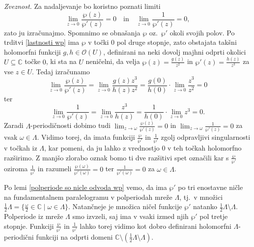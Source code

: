 \documentclass[mat1]{fmfdelo}
\numberwithin{equation}{section}
\newcommand{\C}{\mathbb C}
\newcommand{\om}{\omega}
\newcommand{\torus}{\C/\Lambda}
\newcommand{\hol}[1]{\mathcal{O}(#1)}
\newcommand{\tj}{tj.\ }
\newcommand{\oz}{oz.\ }
\theoremstyle{definition}
\begin{document}
\begin{dokaz}
    \emph{Zveznost.}
    Za nadaljevanje bo koristno poznati limiti
    \[
        \lim_{z \to 0} \frac{\wp(z)}{\wp'(z)} = 0 \quad \text{in} \quad 
        \lim_{z \to 0} \frac{1}{\wp'(z)} = 0,
    \] 
    zato ju izračunajmo. Spomnimo se obnašanja $\wp$ \oz $\wp'$ okoli svojih polov. Po trditvi \ref{lastnosti wp} ima $\wp$ v točki $0$ pol druge stopnje, zato obstajata takšni holomorfni funkciji $g,h \in \hol{U}$, definirani na neki dovolj majhni odprti okolici $U\subseteq\C$ točke $0$, ki sta na $U$ neničelni, da velja $\wp(z) = \frac{g(z)}{z^2}$ in $\wp'(z) = \frac{h(z)}{z^3}$ za vse $z \in U$. Tedaj izračunamo
    \[
        \lim_{z \to 0} \frac{\wp(z)}{\wp'(z)} = \lim_{z \to 0} \frac{g(z)z^3}{h(z)z^2} = 
        \frac{g(0)}{h(0)} \cdot \lim_{z \to 0}\frac{z^3}{z^2} = 0
    \]
    ter
    \[
        \lim_{z \to 0} \frac{1}{\wp'(z)} = \lim_{z \to 0} \frac{z^3}{h(z)} = 
        \frac{1}{h(0)} \cdot \lim_{z \to 0}z^3 = 0.
    \]
    Zaradi $\Lambda$-periodičnosti dobimo tudi $\lim_{z \to \om} \frac{\wp(z)}{\wp'(z)} = 0$ in $\lim_{z \to \om} \frac{1}{\wp'(z)} = 0$ za vsak $\om \in \Lambda$. Vidimo torej, da imata funkciji $\frac{\wp}{\wp'}$ in $\frac{1}{\wp'}$ zgolj odpravljivi singularnosti v točkah iz $\Lambda$, kar pomeni, da ju lahko z vrednostjo $0$ v teh točkah holomorfno razširimo. Z manjšo zlorabo oznak bomo ti dve razšitivi spet označili kar s $\frac{\wp}{\wp'}$ oziroma $\frac{1}{\wp'}$ in razumeli $\frac{\wp(\om)}{\wp'(\om)} = 0$ ter $\frac{1}{\wp'(\om)} = 0$ za $\om \in \Lambda$.

    Po lemi \ref{polperiode so nicle odvoda wp} vemo, da ima $\wp'$ po tri enostavne ničle na fundamentalnem paralelogramu v polperiodah mreže $\Lambda$, \tj v množici $\frac{1}{2}\Lambda = \{\frac{\om}{2} \in \C \mid \om \in \Lambda\}$. 
    Natančneje je množica ničel funkcije $\wp'$ natanko $\frac12\Lambda \setminus \Lambda$. Polperiode iz mreže $\Lambda$ smo izvzeli, saj ima v vsaki izmed njih $\wp'$ pol tretje stopnje. 
    Funkciji $\frac{\wp}{\wp'}$ in $\frac{1}{\wp'}$ lahko torej vidimo kot dobro definirani holomorfni $\Lambda$-periodični funkciji na odprti domeni $\C \setminus (\frac12\Lambda \setminus \Lambda)$. 


\end{dokaz}
\end{document}

